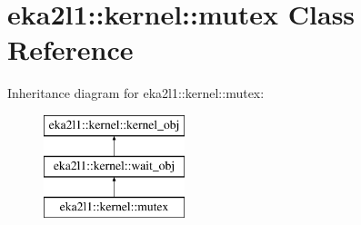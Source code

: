 \hypertarget{classeka2l1_1_1kernel_1_1mutex}{}\section{eka2l1\+:\+:kernel\+:\+:mutex Class Reference}
\label{classeka2l1_1_1kernel_1_1mutex}
Inheritance diagram for eka2l1\+:\+:kernel\+:\+:mutex\+:\begin{figure}[H]
\begin{center}
\leavevmode
\includegraphics[height=3.000000cm]{classeka2l1_1_1kernel_1_1mutex}
\end{center}
\end{figure}
